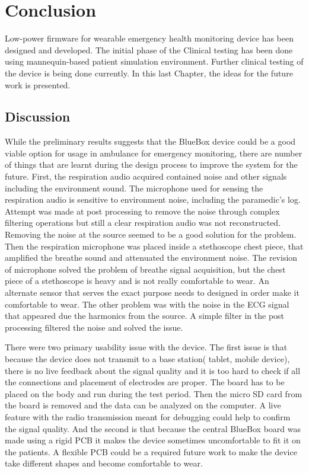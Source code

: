 \chapter{Conclusion}
Low-power firmware for wearable emergency health monitoring device has been designed and developed. The initial phase of the Clinical testing has been done using mannequin-based patient simulation environment. Further clinical testing of the device is being done currently. In this last Chapter, the ideas for the future work is presented.

\section{Discussion}
While the preliminary results suggests that the BlueBox device could be a good viable option for usage in ambulance for emergency monitoring, there are number of things that are learnt during the design process to improve the system for the future. First, the respiration audio acquired contained noise and other signals including the environment sound. The microphone used for sensing the respiration audio is sensitive to environment noise, including the paramedic's log. Attempt was made at post processing to remove the noise through complex filtering operations but still a clear respiration audio was not reconstructed. Removing the noise at the source seemed to be a good solution for the problem. Then the respiration microphone was placed inside a stethoscope chest piece, that amplified the breathe sound and attenuated the environment noise. The revision of microphone solved the problem of breathe signal acquisition, but the chest piece of a stethoscope is heavy and is not really comfortable to wear. An alternate sensor that serves the exact purpose needs to designed in order make it comfortable to wear. The other problem was with the noise in the ECG signal that appeared due the harmonics from the source. A simple filter in the post processing filtered the noise and solved the issue. 

There were two primary usability issue with the device. The first issue is that because the device does not transmit to a base station( tablet, mobile device), there is no live feedback about the signal quality and it is too hard to check if all the connections and placement of electrodes are proper. The board has to be placed on the body and run during the test period. Then the micro SD card from the board is removed and the data can be analyzed on the computer. A live feature with the radio transmission meant for debugging could help to confirm the signal quality. And the second is that because the central BlueBox board was made using a rigid PCB it makes the device sometimes uncomfortable to fit it on the patients. A flexible PCB could be a required future work to make the device take different shapes and become comfortable to wear. 

